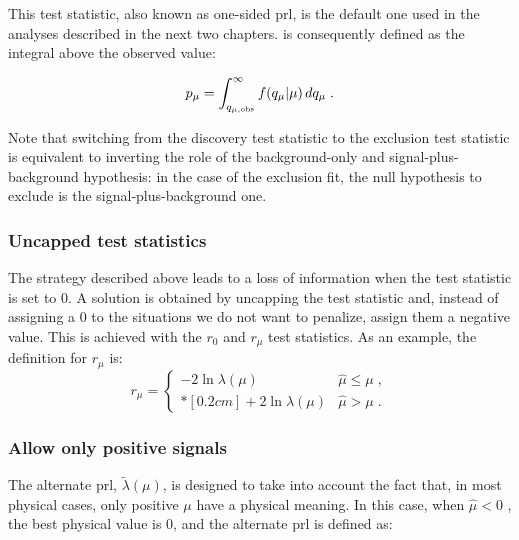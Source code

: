 \noindent This test statistic, also known as one-sided \gls{prl}, is the default one used in the analyses described in the next two chapters. \pmu is consequently defined as the integral above the observed value: 

\begin{equation}
\label{eq:stat:pmu}
p_{\mu} = \int_{q_{\mu,{\rm obs}}}^{\infty} f(q_{\mu} | \mu ) \, d q_{\mu} \;.
\end{equation}

\noindent Note that switching from the discovery test statistic to the exclusion test statistic is equivalent to inverting the role of the background-only and signal-plus-background hypothesis: in the case of the exclusion fit, the null hypothesis to exclude is the signal-plus-background one.


\subsubsection*{Uncapped test statistics}

The strategy described above leads to a loss of information when the test statistic is set to 0. A solution is obtained by uncapping the test statistic and, instead of assigning a 0 to the situations we do not want to penalize, assign them a negative value. This is achieved with the $r_0$ and $r_\mu$ test statistics. As an example, the definition for $r_\mu$ is:
\begin{equation}
\label{eq:rmu}
r_{\mu} =
\left\{ \! \! \begin{array}{ll}
               - 2 \ln \lambda(\mu)  & \hat{\mu} \le \mu  \;, \\*[0.2 cm]
               + 2 \ln \lambda(\mu)  & \hat{\mu} > \mu  \;.
              \end{array}
       \right.
\end{equation}

 
\subsubsection*{Allow only positive signals}

The alternate \gls{prl}, $\tilde{\lambda}({\mu})$, is designed to take into account the fact that, in most physical cases, only positive $\mu$ have a physical meaning. In this case, when $\hat{\mu} < 0$ , the best physical value is 0, and the alternate \gls{prl} is defined as: 

